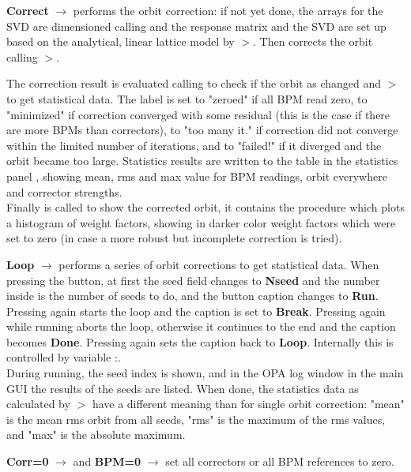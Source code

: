 \documentclass[12pt]{article}
\newcommand\code[1]{{\tt #1}}
\newcommand{\ofld}[1]{\colorbox{black!15}{{{\color{black}\bf #1}}}}
\newcommand\guico[1]{{\color{blue}\code{#1}}}
\newcommand{\unico}[1]{{\color{burntorange}\code{#1}}}
\newcommand{\evcod}[2]{\ofld{#1} $\rightarrow$ \guico{#2}}
\newcommand{\prcod}[2]{\opauni{#1}$>$\unico{#2}}
\newcommand{\vrcod}[2]{\opauni{#1}:\unico{#2}}
\newcommand{\opagui}[1]{\colorbox{blue!20}{{\color{black}\code{#1}}}}
\newcommand{\ogui}[1]{\hyperref[#1]{\opagui{#1}}}
\newcommand{\opauni}[1]{\colorbox{orange!30}{{\color{black}\code{#1}}}}
\begin{document}
\evcod{Correct}{butCorClick} performs the orbit correction: if not yet done, the arrays for the SVD are dimensioned calling \guico{PrepOrbCorr} and the response matrix and the SVD are set up based on the analytical, linear lattice model by \prcod{georblib}{GetResponseMatrix}. Then \guico{OrbitCorrection} corrects the orbit calling \prcod{georblib}{oco\_step}.
 
The correction result is evaluated calling \guico{CodStat} to check if the orbit as changed and \prcod{georblib}{CodStatCalc} to get statistical data. The label \guico{LabOrbStat} is set to "zeroed" if all BPM read zero, to "minimized" if correction converged with some residual (this is the case if there are more BPMs than correctors), to "too many it." if correction did not converge within the limited number of iterations, and to "failed!" if it diverged and the orbit became too large. Statistics results are written to the table in the statistics panel \guico{panctr}, showing mean, rms and max value for BPM readings, orbit everywhere and corrector strengths.\\
Finally \guico{MakePlot} is called to show the corrected orbit, it contains the procedure \guico{WeightPlot} which plots a histogram of weight factors, showing in darker color weight factors which were set to zero (in case a more robust but incomplete correction is tried).

\evcod{Loop}{butLoopClick} performs a series of orbit corrections to get statistical data. When pressing the button, at first the seed field changes to \ofld{Nseed} and the number inside is the number of seeds to do, and the button caption changes to \ofld{Run}.\\
Pressing again starts the loop and the caption is set to \ofld{Break}. Pressing again while running aborts the loop, otherwise it continues to the end and the caption becomes \ofld{Done}. Pressing again sets the caption back to \ofld{Loop}. Internally this is controlled by variable \vrcod{georblib}{loopstatus}. \\
During running, the seed index is shown, and in the OPA log window in the main GUI \ogui{opamenu} the results of the seeds are listed. When done, the statistics data as calculated by  \prcod{opageometry}{LoopStatCalc} have a different meaning than for single orbit correction: "mean" is the mean rms orbit from all seeds, "rms" is the maximum of the rms values, and "max" is the absolute maximum.

\evcod{Corr=0}{butCorZeroClick} and \evcod{BPM=0}{butBPMZeroClick} set all correctors or all BPM references to zero.
\end{document}
